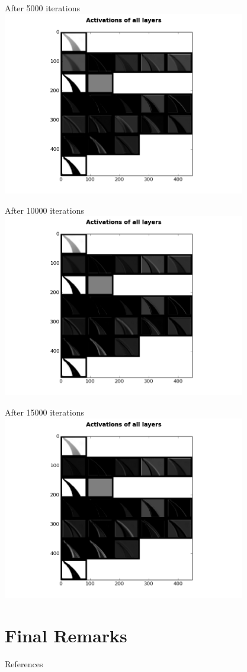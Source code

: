 \begin{frame}{After 5000 iterations}
\includegraphics[height=8.0cm]{data/activations/output-5000.png}\\ 
\end{frame}

\begin{frame}{After 10000 iterations}
\includegraphics[height=8.0cm]{data/activations/output-10000.png}\\ 
\end{frame}

\begin{frame}{After 15000 iterations}
\includegraphics[height=8.0cm]{data/activations/output-15000.png}\\ 
\end{frame}

\section*{Final Remarks}
\begin{frame}{References}
\nocite{GoBeCo16}

\tiny

\end{frame}


